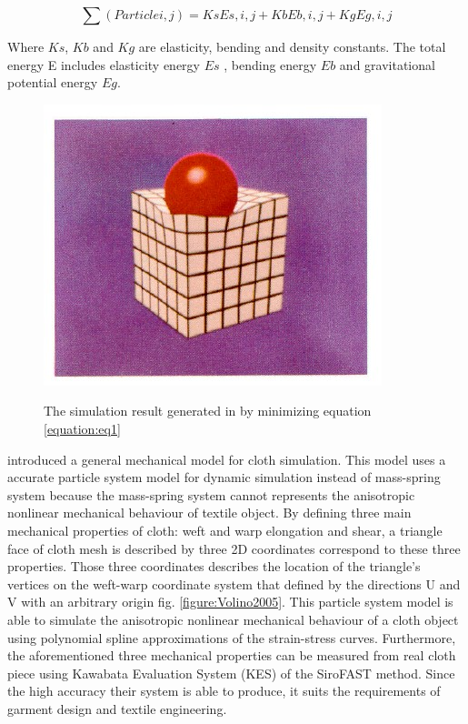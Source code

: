 \begin{equation}
\sum(Particle{i,j}) = K{s}E{s,i,j} + K{b}E{b,i,j} + K{g}E{g,i,j}
\label{equation:eq1} 
\end{equation}

Where $K{s}$, $K{b}$ and $K{g}$ are elasticity, bending and density constants. The total energy E includes elasticity energy $E{s}$ , bending energy $E{b}$ and gravitational potential energy $E{g}$.


\begin{figure}[ht]
    \centering
	\includegraphics[width=0.7\columnwidth]{../images/Terzopoulos1987}\\[1cm]
    \caption{The simulation result generated in \cite{Terzopoulos1987} by minimizing equation \eqref{equation:eq1}}
    \label{figure:Terzopoulos1987}
\end{figure}


\cite{Volino2005} introduced a general mechanical model for cloth simulation.  This model uses a accurate particle system model for dynamic simulation instead of mass-spring system because the mass-spring system cannot represents the anisotropic nonlinear mechanical behaviour of textile object. By defining three main mechanical properties of cloth: weft and warp elongation and shear, a triangle face of cloth mesh is described by three 2D coordinates correspond to these three properties. Those three coordinates describes the location of the triangle's vertices on the weft-warp coordinate system that defined by the directions U and V with an arbitrary origin fig. \ref{figure:Volino2005}. This particle system model is able to simulate the anisotropic nonlinear mechanical behaviour of a cloth object using polynomial spline approximations of the strain-stress curves. Furthermore, the aforementioned three mechanical properties can be measured from real cloth piece using Kawabata Evaluation System (KES) of the SiroFAST method. Since the high accuracy their system is able to produce, it suits the requirements of garment design and textile engineering.


